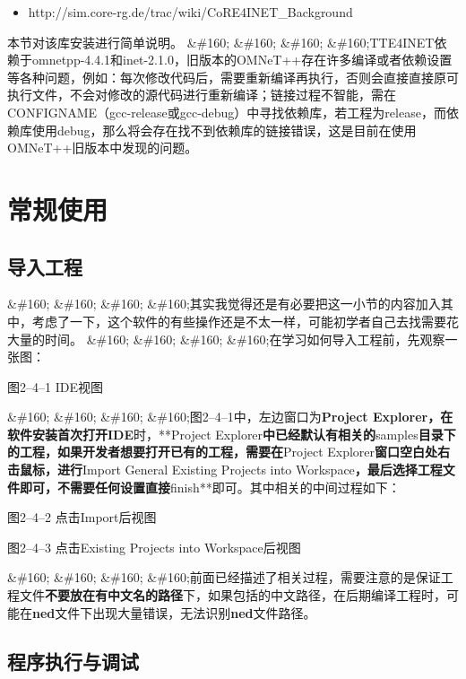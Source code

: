 \begin{itemize}
\item http:\slash \slash sim.core-rg.de\slash trac\slash wiki\slash CoRE4INET\_Background

\end{itemize}

本节对该库安装进行简单说明。
\&\#160; \&\#160; \&\#160; \&\#160;TTE4INET依赖于omnetpp-4.4.1和inet-2.1.0，旧版本的OMNeT++存在许多编译或者依赖设置等各种问题，例如：每次修改代码后，需要重新编译再执行，否则会直接直接原可执行文件，不会对修改的源代码进行重新编译；链接过程不智能，需在CONFIGNAME（gcc-release或gcc-debug）中寻找依赖库，若工程为release，而依赖库使用debug，那么将会存在找不到依赖库的链接错误，这是目前在使用OMNeT++旧版本中发现的问题。

\section{常规使用}
\label{常规使用}

\subsection{导入工程}
\label{导入工程}

\&\#160; \&\#160; \&\#160; \&\#160;其实我觉得还是有必要把这一小节的内容加入其中，考虑了一下，这个软件的有些操作还是不太一样，可能初学者自己去找需要花大量的时间。
\&\#160; \&\#160; \&\#160; \&\#160;在学习如何导入工程前，先观察一张图：

图2--4--1 IDE视图

\&\#160; \&\#160; \&\#160; \&\#160;图2--4--1中，左边窗口为\textbf{Project Explorer\textbf{，在软件安装首次打开}IDE}时，**Project Explorer\textbf{中已经默认有相关的}samples\textbf{目录下的工程，如果开发者想要打开已有的工程，需要在}Project Explorer\textbf{窗口空白处右击鼠标，进行}Import \textbar{} General \textbar{} Existing Projects into Workspace\textbf{，最后选择工程文件即可，不需要任何设置直接}finish**即可。其中相关的中间过程如下：

图2--4--2 点击Import后视图

图2--4--3 点击Existing Projects into Workspace后视图

\&\#160; \&\#160; \&\#160; \&\#160;前面已经描述了相关过程，需要注意的是保证工程文件\textbf{不要放在有中文名的路径}下，如果包括的中文路径，在后期编译工程时，可能在\textbf{ned}文件下出现大量错误，无法识别\textbf{ned}文件路径。

\subsection{程序执行与调试}
\label{程序执行与调试}


